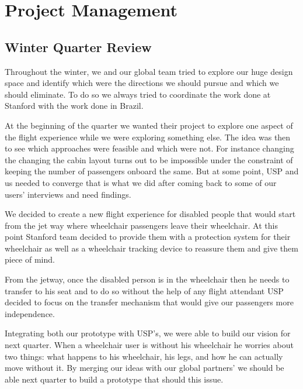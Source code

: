 \chapter{Project Management}
\label{Project_Management}

\section{Winter Quarter Review}
Throughout the winter, we and our global team tried to explore our huge design space and identify which were the directions we should pursue and which we should eliminate. To do so we always tried to coordinate the work done at Stanford with the work done in Brazil. 

At the beginning of the quarter we wanted their project to explore one aspect of the flight experience while we were exploring something else. The idea was then to see which approaches were feasible and which were not. For instance changing the changing the cabin layout turns out to be impossible under the constraint of keeping the number of passengers onboard the same. But at some point, USP and us needed to converge that is what we did after coming back to some of our users’ interviews and need findings. 

We decided to create a new flight experience for disabled people that would start from the jet way where wheelchair passengers leave their wheelchair. At this point Stanford team decided to provide them with a protection system for their wheelchair as well as a wheelchair tracking device to reassure them and give them piece of mind. 

From the jetway, once the disabled person is in the wheelchair then he needs to transfer to his seat and to do so without the help of any flight attendant USP decided to focus on the transfer mechanism that would give our passengers more independence. 

Integrating both our prototype with USP’s, we were able to build our vision for next quarter. When a wheelchair user is without his wheelchair he worries about two things: what happens to his wheelchair, his legs, and how he can actually move without it. By merging our ideas with our global partners’ we should be able next quarter to build a prototype that should this issue.


